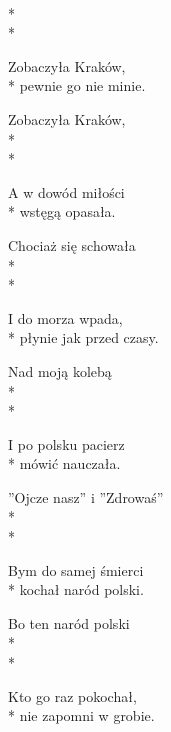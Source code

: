 \begin{lyrics}[multicol=true, longestline={''Ojcze nasz'' i ''Zdrowaś''}]

\\*
\\*
\begin{markverses}[marktext={bis}]%
Zobaczyła Kraków,\\*
pewnie go nie minie.
\end{markverses}

Zobaczyła Kraków,\\*
\\*
\begin{markverses}[marktext={bis}]%
A w dowód miłości\\*
wstęgą opasała.
\end{markverses}

Chociaż się schowała\\*
\\*
\begin{markverses}[marktext={bis}]%
I do morza wpada,\\*
płynie jak przed czasy.
\end{markverses}

Nad moją kolebą\\*
\\*
\begin{markverses}[marktext={bis}]%
I po polsku pacierz\\*
mówić nauczała.
\end{markverses}

''Ojcze nasz'' i ''Zdrowaś''\\*
\\*
\begin{markverses}[marktext={bis}]%
Bym do samej śmierci\\*
kochał naród polski.
\end{markverses}

Bo ten naród polski\\*
\\*
\begin{markverses}[marktext={bis}]%
Kto go raz pokochał,\\*
nie zapomni w grobie.
\end{markverses}


\end{lyrics}

